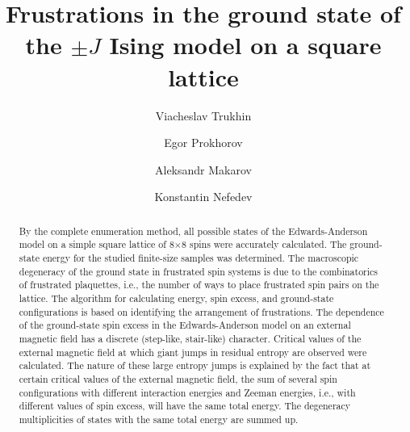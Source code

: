 \documentclass[utf8, babel, sor, jor, amsmath, amssymb, reprint]{elsarticle} %
\begin{document}
\begin{frontmatter}


\title{Frustrations in the ground state of the $\pm J$ Ising model on a square lattice}

\author[mainaddress, secondaryaddress]{Viacheslav Trukhin}

\author[mainaddress]{Egor Prokhorov}

\author[mainaddress, secondaryaddress]{Aleksandr Makarov}

\author[mainaddress, secondaryaddress]{Konstantin Nefedev}


\address[mainaddress]{Far Eastern Federal University, Vladivostok, Russky Island, 10 Ajax Bay, 690922, the Russian Federation}
\address[secondaryaddress]{Institute of Applied Mathematics, Far Eastern Branch, Russian Academy of Science, Vladivostok, Radio 7, 690041, the Russian Federation}

\begin{abstract}

By the complete enumeration method, all possible states of the Edwards-Anderson model on a simple square lattice of 8×8 spins were accurately calculated. The ground-state energy for the studied finite-size samples was determined. The macroscopic degeneracy of the ground state in frustrated spin systems is due to the combinatorics of frustrated plaquettes, i.e., the number of ways to place frustrated spin pairs on the lattice. The algorithm for calculating energy, spin excess, and ground-state configurations is based on identifying the arrangement of frustrations. The dependence of the ground-state spin excess in the Edwards-Anderson model on an external magnetic field has a discrete (step-like, stair-like) character. Critical values of the external magnetic field at which giant jumps in residual entropy are observed were calculated. The nature of these large entropy jumps is explained by the fact that at certain critical values of the external magnetic field, the sum of several spin configurations with different interaction energies and Zeeman energies, i.e., with different values of spin excess, will have the same total energy. The degeneracy multiplicities of states with the same total energy are summed up.

\end{abstract}



\end{frontmatter}
\end{document}
